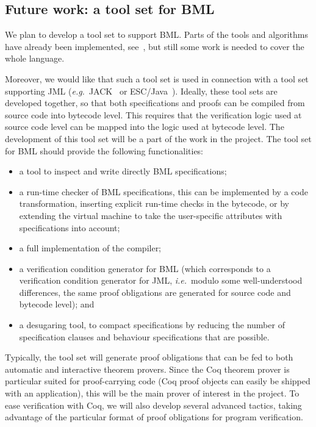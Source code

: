 \subsection{Future work: a tool set for BML}\label{SecTools}

We plan to develop a tool set to support BML. Parts of the tools and
algorithms have already been implemented, see~\cite{BurdyP06}, but
still some work is needed to cover the whole language. 

Moreover, we would like that such a tool set is used in connection
with a tool set supporting JML (\emph{e.g.}\ JACK~\cite{BurdyRL03} or
ESC/Java~\cite{CokK04}). Ideally, these tool sets are developed
together, so that both specifications and proofs can be compiled from
source code into bytecode level. This requires that the verification
logic used at source code level can be mapped into the logic used at
bytecode level. The development of this tool set will be a part of the
work in the \mobius project. The tool set for BML should provide the
following functionalities:

\begin{itemize}
\item a tool to inspect and write directly BML specifications;
\item a run-time checker of BML specifications, this can be
implemented by a code transformation, inserting explicit run-time
checks in the bytecode, or by extending the virtual machine to take
the user-specific attributes with specifications into account;
\item a full implementation of the \JMLtoBML compiler;
\item a verification condition generator for BML (which
corresponds to a verification condition generator for JML,
\emph{i.e.}\ modulo some well-understood differences, the same proof
obligations are generated for source code and bytecode level);  and
\item a desugaring tool, to compact specifications by reducing the
number of specification clauses and behaviour specifications that are
possible. 
\end{itemize}

Typically, the tool set will generate proof obligations that can be
fed to both automatic and interactive theorem provers. Since the Coq
theorem prover is particular suited for proof-carrying code (Coq proof
objects can easily be shipped with an application), this will be the
main prover of interest in the \mobius project. To ease verification
with Coq, we will also develop several advanced tactics, taking
advantage of the particular format of proof obligations for program
verification.
 


